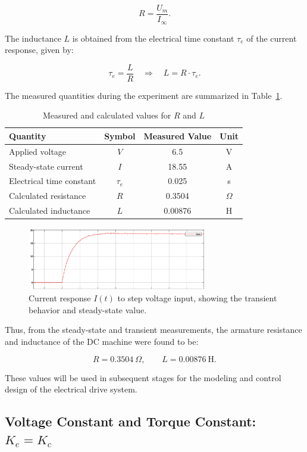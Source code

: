 \documentclass{rapportCS}
\begin{document}
\[
R = \frac{U_m}{I_\infty}.
\]

The inductance $L$ is obtained from the electrical time constant $\tau_e$ of the current response, given by:

\[
\tau_e = \frac{L}{R} \quad \Longrightarrow \quad L = R \cdot \tau_e.
\]

The measured quantities during the experiment are summarized in Table~\ref{tab:RLvalues}.

\begin{table}[H]
\centering
\caption{Measured and calculated values for $R$ and $L$}
\label{tab:RLvalues}
\begin{tabular}{lccc}
\toprule
\textbf{Quantity} & \textbf{Symbol} & \textbf{Measured Value} & \textbf{Unit} \\
\midrule
Applied voltage & $V$ & 6.5 & V \\
Steady-state current & $I$ & 18.55 & A \\
Electrical time constant & $\tau_e$ & 0.025 & s \\
\midrule
Calculated resistance & $R$ & 0.3504 & $\Omega$ \\
Calculated inductance & $L$ & 0.00876 & H \\
\bottomrule
\end{tabular}
\end{table}

\begin{figure}[H]
\centering
\includegraphics[width=0.7\textwidth]{figures/graph_i_time.png}
\caption{Current response $I(t)$ to step voltage input, showing the transient behavior and steady-state value.}
\label{fig:i_time}
\end{figure}

Thus, from the steady-state and transient measurements, the armature resistance and inductance of the DC machine were found to be:

\[
R = 0.3504~\Omega, \qquad L = 0.00876~\mathrm{H}.
\]

These values will be used in subsequent stages for the modeling and control design of the electrical drive system.

\subsection{Voltage Constant and Torque Constant: $K_e = K_c$}
\end{document}
